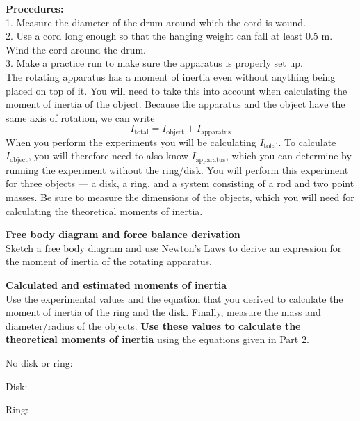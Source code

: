 \documentclass[11pt,letterpaper]{article}
\begin{document}
{\bf Procedures:}\\  
1.  Measure the diameter of the drum around which
the cord is wound.\\
2.  Use a cord long enough so that the hanging weight can fall at least
0.5 m.  Wind the cord around the drum.\\
3.  Make a practice run to make sure the apparatus is properly
set up.\\

The rotating apparatus has a moment of inertia even without anything being placed on top of it. You will need to take this into account when calculating the moment of inertia of the object. Because the apparatus and the object have the same axis of rotation, we can write
$$I_{\mbox{total}}=I_{\mbox{object}}+I_{\mbox{apparatus}}$$
When you perform the experiments you will be calculating $I_{\mbox{total}}$. To calculate $I_{\mbox{object}}$, you will therefore need to also know $I_{\mbox{apparatus}}$, which you can determine by running the experiment without the ring/disk. You will perform this experiment for three objects --- a disk, a ring, and a system consisting of a rod and two point masses.  Be sure to measure the dimensions of the objects, which you will need for calculating the theoretical moments of inertia.\bigskip

{\bf Free body diagram and force balance derivation}\\
Sketch a free body diagram and use Newton's Laws to derive an expression for the moment of inertia of the rotating apparatus.

\clearpage
{\bf Calculated and estimated moments of inertia}\\
Use the experimental values and the equation that you derived to calculate
the moment of inertia of the ring and the disk.
Finally, measure the mass and diameter/radius of the objects. \textbf{Use these values to calculate the theoretical moments of inertia} using the equations given in Part 2.

No disk or ring:\\
\vspace{6cm}

Disk:\\
\vspace{6cm}

Ring:\\
\vspace{6cm}
\end{document}
